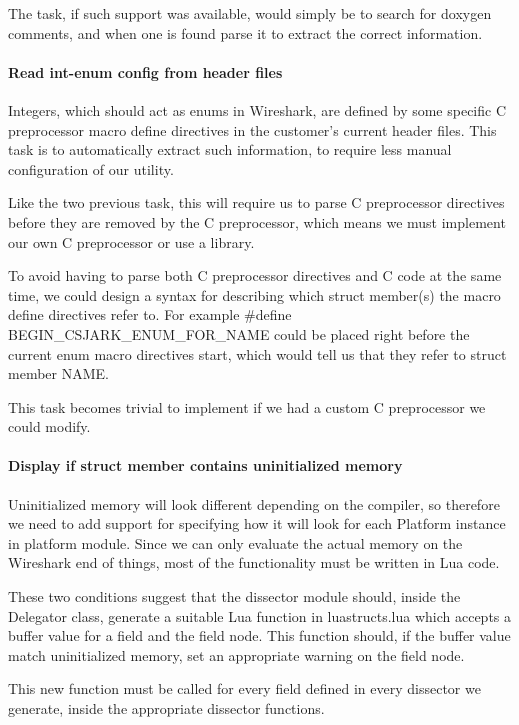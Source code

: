 The task, if such support was available, would simply be to search for doxygen comments, and when one is found parse it to extract the correct information.

\paragraph{Read int-enum config from header files}
Integers, which should act as enums in Wireshark, are defined by some specific C preprocessor macro define directives in the customer's current header files. This task is to automatically extract such information, to require less manual configuration of our utility.

Like the two previous task, this will require us to parse C preprocessor directives before they are removed by the C preprocessor, which means we must implement our own C preprocessor or use a library.

To avoid having to parse both C preprocessor directives and C code at the same time, we could design a syntax for describing which struct member(s) the macro define directives refer to. For example \#define BEGIN\_CSJARK\_ENUM\_FOR\_NAME could be placed right before the current enum macro directives start, which would tell us that they refer to struct member NAME.

This task becomes trivial to implement if we had a custom C preprocessor we could modify.

\paragraph{Display if struct member contains uninitialized memory}
Uninitialized memory will look different depending on the compiler, so therefore we need to add support for specifying how it will look for each Platform instance in platform module. Since we can only evaluate the actual memory on the Wireshark end of things, most of the functionality must be written in Lua code.

These two conditions suggest that the dissector module should, inside the Delegator class, generate a suitable Lua function in luastructs.lua which accepts a buffer value for a field and the field node. This function should, if the buffer value match uninitialized memory, set an appropriate warning on the field node.

This new function must be called for every field defined in every dissector we generate, inside the appropriate dissector functions.


